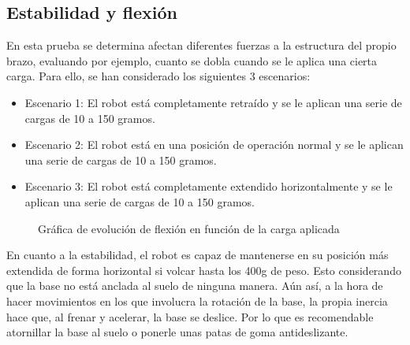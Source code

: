 \subsection{Estabilidad y flexión}
\noindent En esta prueba se determina afectan diferentes fuerzas a la estructura del propio brazo, evaluando por ejemplo, cuanto se dobla 
cuando se le aplica una cierta carga.
Para ello, se han considerado los siguientes 3 escenarios:
\begin{itemize}
    \item Escenario 1: El robot está completamente retraído y se le aplican una serie de cargas de 10 a 150 gramos.
    \item Escenario 2: El robot está en una posición de operación normal y se le aplican una serie de cargas de 10 a 150 gramos.
    \item Escenario 3: El robot está completamente extendido horizontalmente y se le aplican una serie de cargas de 10 a 150 gramos.
\end{itemize}

\begin{figure} [ht!]
    \centering
    \caption{Gráfica de evolución de flexión en función de la carga aplicada}
    \label{fig:grafica-flexion}
  \end{figure}
En cuanto a la estabilidad, el robot es capaz de mantenerse en su posición más extendida de forma horizontal si volcar hasta los 400g 
de peso. Esto considerando que la base no está anclada al suelo de ninguna manera. Aún así, a la hora de hacer movimientos en los que involucra 
la rotación de la base, la propia inercia hace que, al frenar y acelerar, la base se deslice. Por lo que es recomendable atornillar la base al 
suelo o ponerle unas patas de goma antideslizante. 

